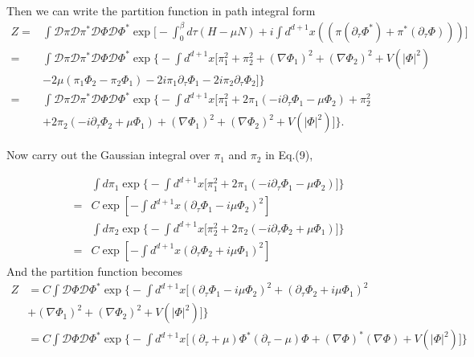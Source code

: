 \documentclass[12pt]{article}
\begin{document}
Then we can write the partition function in path integral form
\begin{equation}
    \begin{split}
        Z=&\int \mathcal{D}\pi\mathcal{D}\pi^*\mathcal{D}\Phi\mathcal{D}\Phi^*
        \exp\bigg[-\int_0^\beta d\tau(H-\mu N)+i\int d^{d+1}x((\pi(\partial_\tau
        \Phi^*)+\pi^*(\partial_\tau\Phi)))\bigg]\\
        =&\int \mathcal{D}\pi\mathcal{D}\pi^*\mathcal{D}\Phi\mathcal{D}\Phi^*
        \exp\bigg\{-\int d^{d+1}x\Big[\pi_1^2+\pi_2^2+(\nabla\Phi_1)^2+(\nabla
        \Phi_2)^2+V(|\Phi|^2)\\
        &-2\mu(\pi_1\Phi_2-\pi_2\Phi_1)-2i\pi_1\partial_\tau
        \Phi_1-2i\pi_2\partial_\tau\Phi_2\Big]\bigg\}\\
        =&\int \mathcal{D}\pi\mathcal{D}\pi^*\mathcal{D}\Phi\mathcal{D}\Phi^*
        \exp\bigg\{-\int d^{d+1}x\Big[\pi_1^2+2\pi_1(-i\partial_\tau\Phi_1
        -\mu\Phi_2)+\pi_2^2\\
        &+2\pi_2(-i\partial_\tau\Phi_2+\mu\Phi_1)+(\nabla\Phi_1)^2
        +(\nabla\Phi_2)^2+V(|\Phi|^2)\Big]\bigg\}.
    \end{split}
\end{equation}

Now carry out the Gaussian integral over $\pi_1$ and $\pi_2$ in Eq.(9),

\begin{equation}
    \begin{split}
        &\int d\pi_1\exp\bigg\{-\int d^{d+1}x\Big[\pi_1^2+2\pi_1
        (-i\partial_\tau\Phi_1-\mu\Phi_2)\Big]\bigg\}\\
        =&C\exp[-\int d^{d+1}x(\partial_\tau\Phi_1-i\mu\Phi_2)^2]
    \end{split}
\end{equation}
\begin{equation}
    \begin{split}
        &\int d\pi_2\exp\bigg\{-\int d^{d+1}x\Big[\pi_2^2+2\pi_2
        (-i\partial_\tau\Phi_2+\mu\Phi_1)\Big]\bigg\}\\
        =&C\exp[-\int d^{d+1}x(\partial_\tau\Phi_2+i\mu\Phi_1)^2]
    \end{split}
\end{equation}
And the partition function becomes
\begin{equation}
    \begin{split}
        Z&=C\int \mathcal{D}\Phi\mathcal{D}\Phi^*\exp\bigg\{-\int d^{d+1}x
        \Big[(\partial_\tau\Phi_1-i\mu\Phi_2)^2+(\partial_\tau\Phi_2
        +i\mu\Phi_1)^2\\
        &+(\nabla\Phi_1)^2+(\nabla\Phi_2)^2+V(|\Phi|^2)\Big]\bigg\}\\
        &=C\int \mathcal{D}\Phi\mathcal{D}\Phi^*\exp\bigg\{-\int d^{d+1}x
        \Big[(\partial_\tau+\mu)\Phi^*(\partial_\tau-\mu)\Phi+(\nabla\Phi)^*
        (\nabla\Phi)+V(|\Phi|^2)\Big]\bigg\}
    \end{split}
\end{equation}
\end{document}
